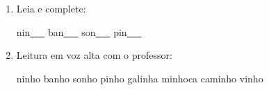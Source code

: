 \begin{exercicio}
\begin{enumerate}[resume]
\begin{enumerate}[label=(\alph*)]
    \item O som da unidade é: ( ) oral ( ) nasal 

    \item A primeira sílaba de NINHO é: ( ) NHA ( ) NHE

    \item As palavras da unidade aparecem: ( ) no início ( ) no meio ( ) no fim das palavras

  \end{enumerate}

  \item Leia e complete:
  \begin{center}
  nin\underline{~~~} \quad ban\underline{~~~} \quad son\underline{~~~} \quad pin\underline{~~~}
  \end{center}

  \item Leitura em voz alta com o professor:
  \begin{center}
  ninho \quad banho \quad sonho \quad pinho \quad galinha \quad minhoca \quad caminho \quad vinho
  \end{center}

\end{enumerate}

\end{exercicio}



